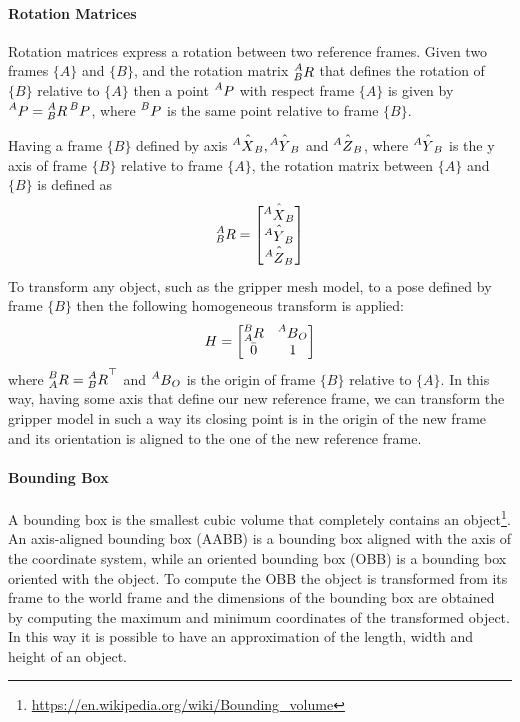 \paragraph{Rotation Matrices}
Rotation matrices express a rotation between two reference frames. Given two frames $\{A\}$ and $\{B\}$, and the rotation matrix $\prescript{A}{B}R$ that defines the rotation of $\{B\}$ relative to $\{A\}$ then a point $\prescript{A}{}P$ with respect frame $\{A\}$ is given by $\prescript{A}{}P=\prescript{A}{B}R\prescript{B}{}P$, where $\prescript{B}{}P$ is the same point relative to frame $\{B\}$. 

Having a frame $\{B\}$ defined by axis $\hat{\prescript{A}{}X_B},\hat{\prescript{A}{}Y_B}$ and $\hat{\prescript{A}{}Z_B}$, where $\hat{\prescript{A}{}Y_B}$ is the y axis of frame $\{B\}$ relative to frame $\{A\}$, the rotation matrix between $\{A\}$ and $\{B\}$ is defined as
\[
\prescript{A}{B}R = 
\begin{bmatrix}
\hat{\prescript{A}{}X_B} \\
\hat{\prescript{A}{}Y_B} \\
\hat{\prescript{A}{}Z_B} \\
\end{bmatrix}
\]
To transform any object, such as the gripper mesh model, to a pose defined by frame $\{B\}$ then the following homogeneous transform is applied:
\[
H = 
\begin{bmatrix}
\prescript{B}{A}R & \prescript{A}{}B_O \\
\bar{0} & 1
\end{bmatrix}
\]
where  $\prescript{B}{A}R={\prescript{A}{B}R}^{\top}$ and $\prescript{A}{}B_O$ is the origin of frame $\{B\}$ relative to $\{A\}$. In this way, having some axis that define our new reference frame, we can transform the gripper model in such a way its closing point is in the origin of the new frame and its orientation is aligned to the one of the new reference frame. 

\paragraph{Bounding Box}
A bounding box is the smallest cubic volume that completely contains an object\footnote{\href{https://en.wikipedia.org/wiki/Bounding_volume}{\url{https://en.wikipedia.org/wiki/Bounding\_volume}}}.
An axis-aligned bounding box (AABB) is a bounding box aligned with the axis of the coordinate system, while an oriented bounding box (OBB) is a bounding box oriented with the object. To compute the OBB the object is transformed from its frame to the world frame and the dimensions of the bounding box are obtained by computing the maximum and minimum coordinates of the transformed object. In this way it is possible to have an approximation of the length, width and height of an object.

